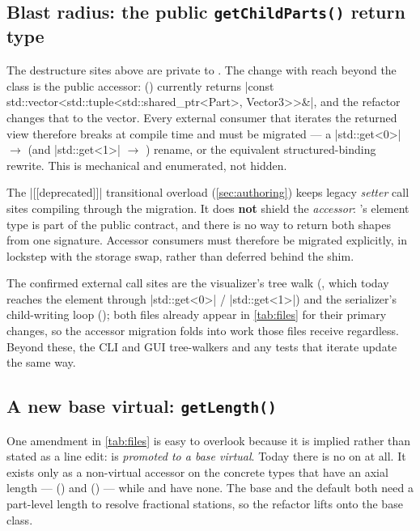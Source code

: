 \subsection*{Blast radius: the public \texttt{getChildParts()} return type}

The destructure sites above are private to . The change with reach beyond the class
is the public accessor:  () currently returns
\cppinline|const std::vector<std::tuple<std::shared_ptr<Part>, Vector3>>&|, and the refactor
changes that to the  vector. Every external consumer that iterates
the returned view therefore breaks at compile time and must be migrated --- a
\cppinline|std::get<0>| $\rightarrow$  (and \cppinline|std::get<1>| $\rightarrow$
) rename, or the equivalent structured-binding rewrite. This is mechanical and
enumerated, not hidden.

\begin{designrule}
The \cppinline|[[deprecated]]| transitional  overload
(\cref{sec:authoring}) keeps legacy \emph{setter} call sites compiling through the migration.
It does \textbf{not} shield the \emph{accessor}: 's element type is part of
the public contract, and there is no way to return both shapes from one signature. Accessor
consumers must therefore be migrated explicitly, in lockstep with the storage swap, rather than
deferred behind the shim.
\end{designrule}

The confirmed external call sites are the visualizer's tree walk
(, which today reaches the element through
\cppinline|std::get<0>| / \cppinline|std::get<1>|) and the serializer's child-writing loop
(); both files already appear in \cref{tab:files} for their
primary changes, so the accessor migration folds into work those files receive regardless.
Beyond these, the CLI and GUI tree-walkers and any tests that iterate 
update the same way.

\subsection*{A new base virtual: \texttt{getLength()}}

One amendment in \cref{tab:files} is easy to overlook because it is implied rather than stated
as a line edit:  is \emph{promoted to a base  virtual}. Today
there is no  on  at all. It exists only as a non-virtual accessor
on the concrete types that have an axial length --- 
() and 
() --- while  and  have none.
The base  and the default  both need a part-level length to
resolve fractional stations, so the refactor lifts  onto the base class.


